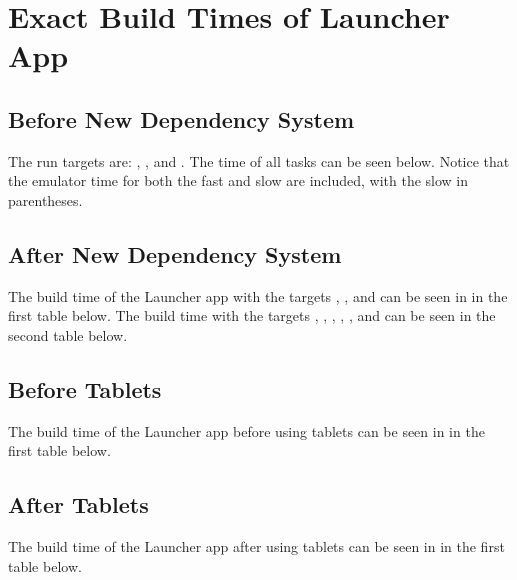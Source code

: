 \chapter{Exact Build Times of Launcher App}
\label{app:build_times}

\section{Before New Dependency System}
The run targets are: , , and . The time of all tasks can be seen below. Notice that the emulator time for both the fast and slow are included, with the slow in parentheses.



\section{After New Dependency System}
The build time of the Launcher app with the targets , , and  can be seen in in the first table below. The build time with the targets , , , , , and  can be seen in the second table below.




\section{Before Tablets}
The build time of the Launcher app before using tablets can be seen in in the first table below.



\section{After Tablets}
The build time of the Launcher app after using tablets can be seen in in the first table below.


